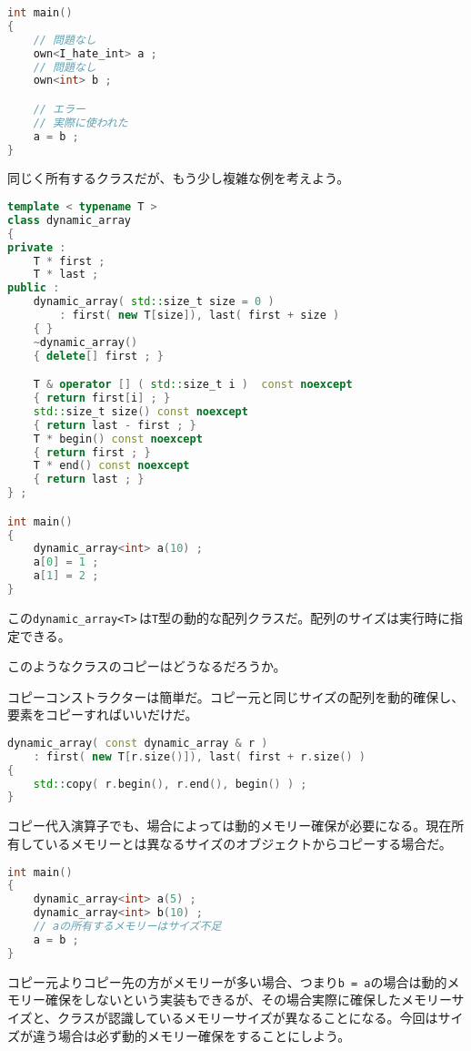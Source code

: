 \begin{lstlisting}[language={C++}]
int main()
{
    // 問題なし
    own<I_hate_int> a ;
    // 問題なし
    own<int> b ;

    // エラー
    // 実際に使われた
    a = b ;
}
\end{lstlisting}


同じく所有するクラスだが、もう少し複雑な例を考えよう。

\begin{lstlisting}[language={C++}]
template < typename T >
class dynamic_array
{
private :
    T * first ;
    T * last ;
public :
    dynamic_array( std::size_t size = 0 )
        : first( new T[size]), last( first + size )
    { }
    ~dynamic_array()
    { delete[] first ; }

    T & operator [] ( std::size_t i )  const noexcept
    { return first[i] ; }
    std::size_t size() const noexcept
    { return last - first ; }
    T * begin() const noexcept
    { return first ; }
    T * end() const noexcept
    { return last ; }
} ;

int main()
{
    dynamic_array<int> a(10) ;
    a[0] = 1 ;
    a[1] = 2 ;
}
\end{lstlisting}

この\texttt{dynamic\_array<T>}\,は\texttt{T}型の動的な配列クラスだ。配列のサイズは実行時に指定できる。

このようなクラスのコピーはどうなるだろうか。

コピーコンストラクターは簡単だ。コピー元と同じサイズの配列を動的確保し、要素をコピーすればいいだけだ。

\begin{lstlisting}[language={C++}]
dynamic_array( const dynamic_array & r )
    : first( new T[r.size()]), last( first + r.size() ) 
{
    std::copy( r.begin(), r.end(), begin() ) ;
}
\end{lstlisting}

コピー代入演算子でも、場合によっては動的メモリー確保が必要になる。現在所有しているメモリーとは異なるサイズのオブジェクトからコピーする場合だ。

\begin{lstlisting}[language={C++}]
int main()
{
    dynamic_array<int> a(5) ;
    dynamic_array<int> b(10) ;
    // aの所有するメモリーはサイズ不足
    a = b ;
}
\end{lstlisting}

コピー元よりコピー先の方がメモリーが多い場合、つまり\texttt{b = a}の場合は動的メモリー確保をしないという実装もできるが、その場合実際に確保したメモリーサイズと、クラスが認識しているメモリーサイズが異なることになる。今回はサイズが違う場合は必ず動的メモリー確保をすることにしよう。

